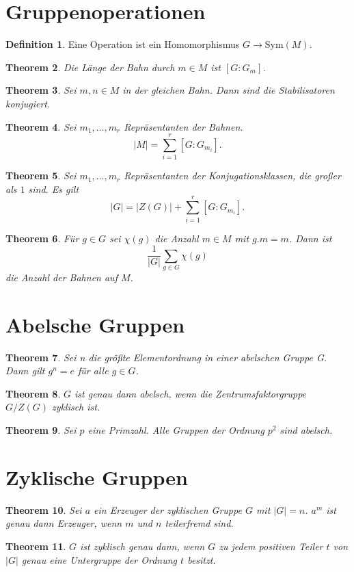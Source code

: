 \documentclass[prb,12pt]{revtex4-2}
\newtheorem{Theorem}{Theorem}
\theoremstyle{definition}
\theoremstyle{definition}
\newtheorem{Definition}[Theorem]{Definition}
\begin{document}
	\section{Gruppenoperationen}
	\begin{Definition}
		Eine Operation ist ein Homomorphismus $G\to \text{Sym}(M)$.
	\end{Definition}
	\begin{Theorem}
		Die Länge der Bahn durch $m\in M$ ist $[G : G_m]$.
	\end{Theorem}
	\begin{Theorem}
		Sei $m,n\in M$ in der gleichen Bahn. Dann sind die Stabilisatoren konjugiert.
	\end{Theorem}
	\begin{Theorem}
		Sei $m_1,\dots, m_r$ Repräsentanten der Bahnen.
		\[
			|M|=\sum_{i=1}^r [G:G_{m_i}]
		.\] 
	\end{Theorem}
	\begin{Theorem}
		Sei $m_1,\dots, m_r$ Repräsentanten der Konjugationsklassen, die großer als $1$ sind. Es gilt
		\[
			|G|=|Z(G)|+\sum_{i=1}^r [G:G_{m_i}]
		.\] 
	\end{Theorem}
	\begin{Theorem}
		F\"{u}r $g\in G$ sei $\chi(g)$ die Anzahl $m\in M$ mit $g.m=m$. Dann ist
		\[
			\frac{1}{|G|}\sum_{g\in G}\chi(g)
		\]
		die Anzahl der Bahnen auf $M$.
	\end{Theorem}
	\section{Abelsche Gruppen}
\begin{Theorem}
Sei n die größte Elementordnung in einer abelschen Gruppe G. Dann gilt $g^n = e$ für alle $g \in G$.	
\end{Theorem}
\begin{Theorem}
	$G$ ist genau dann abelsch, wenn die Zentrumsfaktorgruppe $G / Z(G)$ zyklisch ist.
\end{Theorem}
\begin{Theorem}
	Sei $p$ eine Primzahl. Alle Gruppen der Ordnung $p^2$ sind abelsch.
\end{Theorem}
	\section{Zyklische Gruppen}
	\begin{Theorem}
		Sei $a$ ein Erzeuger der zyklischen Gruppe $G$ mit $|G|=n$. $a^m$ ist genau dann Erzeuger, wenn $m$ und $n$ teilerfremd sind.
	\end{Theorem}
	\begin{Theorem}
		$G$ ist zyklisch genau dann, wenn $G$ zu jedem positiven Teiler $t$ von $|G|$ genau eine Untergruppe der Ordnung $t$ besitzt.
	\end{Theorem}
\end{document}
